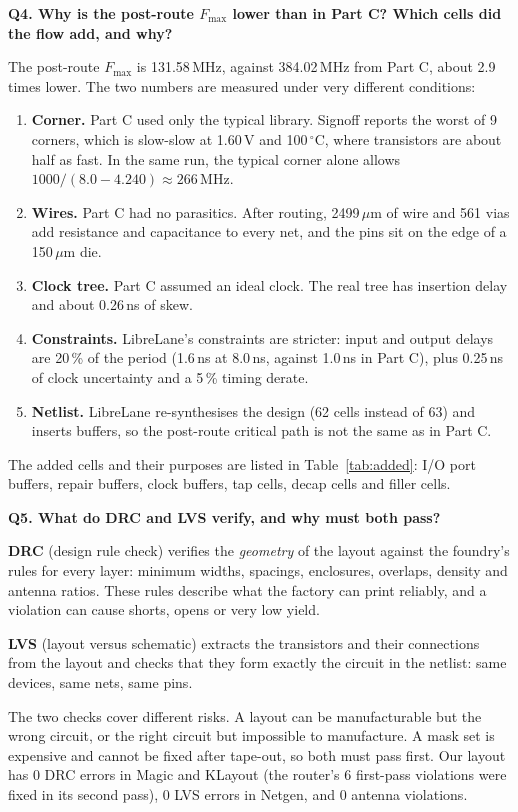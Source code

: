 \documentclass[10pt,a4paper,twocolumn]{article}
\newcommand{\um}{\,$\mu$m}
\newcommand{\Fmax}{$F_{\max}$}
\newcommand{\q}[1]{\par\smallskip\noindent\textbf{#1}\par}
\begin{document}
\q{Q4. Why is the post-route \Fmax{} lower than in Part C? Which cells did the flow add, and why?}
The post-route \Fmax{} is 131.58\,MHz, against 384.02\,MHz from Part C, about 2.9 times lower. The two numbers are measured under very different conditions:
\begin{enumerate}
  \item \textbf{Corner.} Part C used only the typical library. Signoff reports the worst of 9 corners, which is slow-slow at 1.60\,V and 100\,$^\circ$C, where transistors are about half as fast. In the same run, the typical corner alone allows $1000/(8.0 - 4.240) \approx 266$\,MHz.
  \item \textbf{Wires.} Part C had no parasitics. After routing, 2499\um{} of wire and 561 vias add resistance and capacitance to every net, and the pins sit on the edge of a 150\um{} die.
  \item \textbf{Clock tree.} Part C assumed an ideal clock. The real tree has insertion delay and about 0.26\,ns of skew.
  \item \textbf{Constraints.} LibreLane's constraints are stricter: input and output delays are 20\,\% of the period (1.6\,ns at 8.0\,ns, against 1.0\,ns in Part C), plus 0.25\,ns of clock uncertainty and a 5\,\% timing derate.
  \item \textbf{Netlist.} LibreLane re-synthesises the design (62 cells instead of 63) and inserts buffers, so the post-route critical path is not the same as in Part C.
\end{enumerate}
The added cells and their purposes are listed in Table~\ref{tab:added}: I/O port buffers, repair buffers, clock buffers, tap cells, decap cells and filler cells.

\q{Q5. What do DRC and LVS verify, and why must both pass?}
\textbf{DRC} (design rule check) verifies the \emph{geometry} of the layout against the foundry's rules for every layer: minimum widths, spacings, enclosures, overlaps, density and antenna ratios. These rules describe what the factory can print reliably, and a violation can cause shorts, opens or very low yield.

\textbf{LVS} (layout versus schematic) extracts the transistors and their connections from the layout and checks that they form exactly the circuit in the netlist: same devices, same nets, same pins.

The two checks cover different risks. A layout can be manufacturable but the wrong circuit, or the right circuit but impossible to manufacture. A mask set is expensive and cannot be fixed after tape-out, so both must pass first. Our layout has 0 DRC errors in Magic and KLayout (the router's 6 first-pass violations were fixed in its second pass), 0 LVS errors in Netgen, and 0 antenna violations.
\end{document}
